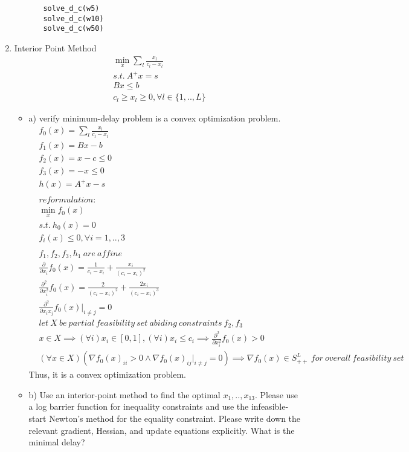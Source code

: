 \documentclass[12pt,letter]{article}
\newcommand{\set}[1]{\{#1\}}
\begin{document}
\begin{enumerate}
\begin{enumerate}
\begin{itemize}
\begin{verbatim}
solve_d_c(w5)
solve_d_c(w10)
solve_d_c(w50)
\end{verbatim}
    \end{itemize}
    \pagebreak    
  \end{enumerate}
\item Interior Point Method
  \begin{align*}
    \min_x \sum_l \frac{x_l}{c_l-x_l}\\
    s.t.\ A^+x = s\\
    Bx \leq b\\
    c_l \geq x_l \geq 0, \forall l \in \set{1,..,L}
  \end{align*}
  \begin{itemize}
  \item a) verify minimum-delay problem is a convex optimization problem.\\
    \begin{align*}
      &f_0(x) = \sum_l \frac{x_l}{c_l-x_l}\\
      &f_1(x) = Bx - b\\
      &f_2(x) = x - c \leq 0\\
      &f_3(x) = -x \leq 0\\
      &h(x) = A^+x -s\\
      \\
      &reformulation:\\
      &\min_x f_0(x)\\
      &s.t.\ h_0(x) = 0\\
      &f_i(x) \leq 0, \forall i=1,..,3\\
      \\
      &f_1,f_2,f_3,h_1\ are\ affine\\
      &\frac{\partial}{\partial x_i} f_0(x) = \frac{1}{c_i-x_i} + \frac{x_i}{(c_i-x_i)^2}\\
      &\frac{\partial^2}{\partial x_i^2} f_0(x) = \frac{2}{(c_i-x_i)^2} + \frac{2x_i}{(c_i-x_i)^3}\\
      &\frac{\partial^2}{\partial x_i x_j} f_0(x)|_{i\not=j} = 0\\
      &let\ X\ be\ partial\ feasibility\ set\ abiding\ constraints\ f_2, f_3\\
      &x\in X \implies (\forall i)x_i\in [0,1], (\forall i) x_i \leq c_i \implies \frac{\partial^2}{\partial x_i^2} f_0(x) > 0\\
      &(\forall x\in X) (\nabla f_0(x)_{ii} > 0 \wedge \nabla f_0(x)_{ij}|_{i\not=j} = 0) \implies \nabla f_0(x) \in S_{++}^L\ for\ overall\ feasibility\ set
    \end{align*}
    Thus, it is a convex optimization problem.
    \pagebreak
  \item b) Use an interior-point method to find the optimal $x_1,..,x_{13}$. Please use a log barrier function for inequality constraints and use the infeasible-start Newton’s method for the equality constraint. Please write down the relevant gradient, Hessian, and update equations explicitly. What is the minimal delay?


\end{itemize}
\end{enumerate}
\end{document}
